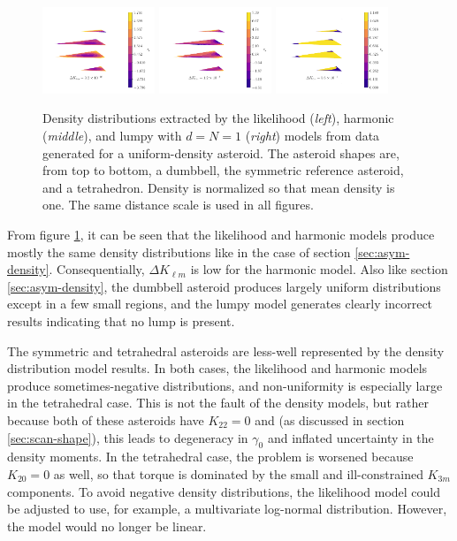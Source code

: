 \documentclass[fleqn,usenatbib]{mnras}
\begin{document}
\begin{figure}
  \includegraphics[width=0.3\textwidth]{figs/tet-likelihood.pdf}\hfill
  \includegraphics[width=0.3\textwidth]{figs/tet-harmonic.pdf}\hfill
  \includegraphics[width=0.3\textwidth]{figs/tet-lumpy.pdf}
  \caption{Density distributions extracted by the likelihood (\textit{left}), harmonic (\textit{middle}), and lumpy with $d=N=1$ (\textit{right}) models from data generated for a uniform-density asteroid. The asteroid shapes are, from top to bottom, a dumbbell, the symmetric reference asteroid, and a tetrahedron. Density is normalized so that mean density is one. The same distance scale is used in all figures.}
  \label{fig:uniform-density}
\end{figure}

From figure \ref{fig:uniform-density}, it can be seen that the likelihood and harmonic models produce mostly the same density distributions like in the case of section \ref{sec:asym-density}. Consequentially, $\Delta K_{\ell m}$ is low for the harmonic model. Also like section \ref{sec:asym-density}, the dumbbell asteroid produces largely uniform distributions except in a few small regions, and the lumpy model generates clearly incorrect results indicating that no lump is present.

The symmetric and tetrahedral asteroids are less-well represented by the density distribution model results. In both cases, the likelihood and harmonic models produce sometimes-negative distributions, and non-uniformity is especially large in the tetrahedral case. This is not the fault of the density models, but rather because both of these asteroids have $K_{22} = 0$ and (as discussed in section \ref{sec:scan-shape}), this leads to degeneracy in $\gamma_0$ and inflated uncertainty in the density moments. In the tetrahedral case, the problem is worsened because $K_{20}=0$ as well, so that torque is dominated by the small and ill-constrained $K_{3m}$ components. To avoid negative density distributions, the likelihood model could be adjusted to use, for example, a multivariate log-normal distribution. However, the model would no longer be linear.
\end{document}
